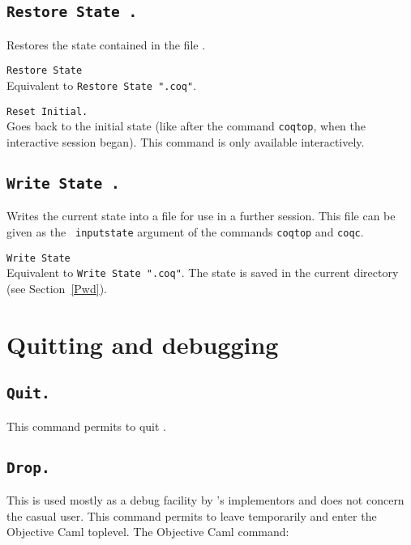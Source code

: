 \subsection[\tt Restore State \str.]{\tt Restore State \str.}
  Restores the state contained in the file \str.

\begin{Variants}
\item {\tt Restore State \ident}\\
 Equivalent to {\tt Restore State "}{\ident}{\tt .coq"}.
\item {\tt Reset Initial.}\\ 
  Goes back to the initial state (like after the command {\tt coqtop},
  when the interactive session began). This command is only available
  interactively.
\end{Variants}

\subsection[\tt Write State \str.]{\tt Write State \str.}
Writes the current state into a file \str{} for
use in a further session. This file can be given as the {\tt
  inputstate} argument of the commands {\tt coqtop} and {\tt coqc}.

\begin{Variants}
\item {\tt Write State \ident}\\
 Equivalent to {\tt Write State "}{\ident}{\tt .coq"}.
 The state is saved in the current directory (see Section~\ref{Pwd}).
\end{Variants}

\section{Quitting and debugging}

\subsection[\tt Quit.]{\tt Quit.}
This command permits to quit \Coq.

\subsection[\tt Drop.]{\tt Drop.\label{Drop}}

This is used mostly as a debug facility by \Coq's implementors
and does not concern the casual user.
This command permits to leave {\Coq} temporarily and enter the
Objective Caml toplevel. The Objective Caml command:

